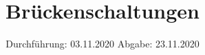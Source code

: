 

\subject{V302}
\title{Brückenschaltungen}
\date{%
  Durchführung: 03.11.2020
  \hspace{3em}
  Abgabe: 23.11.2020
}



\maketitle
\thispagestyle{empty}
\tableofcontents
\newpage







\printbibliography{}


